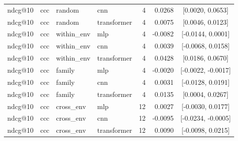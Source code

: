 \begin{longtable}{llllrrc}
ndcg@10 & ccc & random & cnn & 4 & 0.0268 & [0.0020, 0.0653] \\
ndcg@10 & ccc & random & transformer & 4 & 0.0075 & [0.0046, 0.0123] \\
ndcg@10 & ccc & within\_env & mlp & 4 & -0.0082 & [-0.0144, 0.0001] \\
ndcg@10 & ccc & within\_env & cnn & 4 & 0.0039 & [-0.0068, 0.0158] \\
ndcg@10 & ccc & within\_env & transformer & 4 & 0.0428 & [0.0186, 0.0670] \\
ndcg@10 & ccc & family & mlp & 4 & -0.0020 & [-0.0022, -0.0017] \\
ndcg@10 & ccc & family & cnn & 4 & 0.0031 & [-0.0128, 0.0191] \\
ndcg@10 & ccc & family & transformer & 4 & 0.0135 & [0.0004, 0.0267] \\
ndcg@10 & ccc & cross\_env & mlp & 12 & 0.0027 & [-0.0030, 0.0177] \\
ndcg@10 & ccc & cross\_env & cnn & 12 & -0.0095 & [-0.0234, -0.0005] \\
ndcg@10 & ccc & cross\_env & transformer & 12 & 0.0090 & [-0.0098, 0.0215] \\
\end{longtable}
